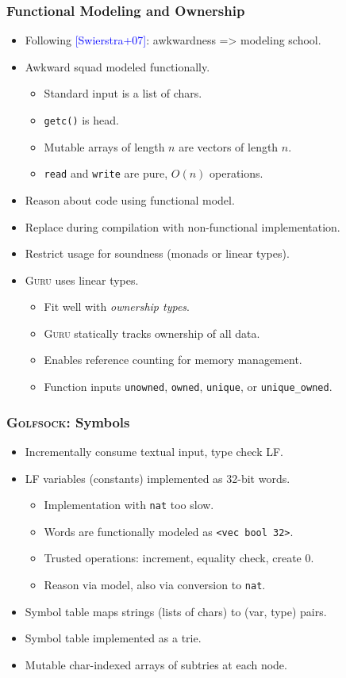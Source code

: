 \documentclass[11pt]{beamer}
\begin{document}
\begin{frame}
\frametitle{Functional Modeling and Ownership}
\begin{itemize}
\item Following \textcolor{blue}{[Swierstra+07]}: awkwardness => modeling school.
\item Awkward squad modeled functionally.
\begin{itemize}
\item Standard input is a list of chars.
\item \texttt{getc()} is head.
\item Mutable arrays of length $n$ are vectors of length $n$.
\item \texttt{read} and \texttt{write} are pure, $O(n)$ operations.
\end{itemize}
\item Reason about code using functional model.
\item Replace during compilation with non-functional implementation.
\item Restrict usage for soundness (monads or linear types).
\item \textsc{Guru} uses linear types.
\begin{itemize}
\item Fit well with \emph{ownership types}.
\item \textsc{Guru} statically tracks ownership of all data.
\item Enables reference counting for memory management.
\item Function inputs \texttt{unowned}, \texttt{owned}, \texttt{unique}, or \texttt{unique\_owned}.
\end{itemize}
\end{itemize}
\end{frame}

\begin{frame}
\frametitle{\textsc{Golfsock}: Symbols}
\begin{itemize}
\item Incrementally consume textual input, type check LF.
\item LF variables (constants) implemented as 32-bit words.
\begin{itemize}
\item Implementation with \texttt{nat} too slow.
\item Words are functionally modeled as \texttt{<vec bool 32>}.
\item Trusted operations: increment, equality check, create 0.
\item Reason via model, also via conversion to \texttt{nat}.
\end{itemize}
\item Symbol table maps strings (lists of chars) to (var, type) pairs.
\item Symbol table implemented as a trie.
\item Mutable char-indexed arrays of subtries at each node.
\end{itemize}
\end{frame}
\end{document}
